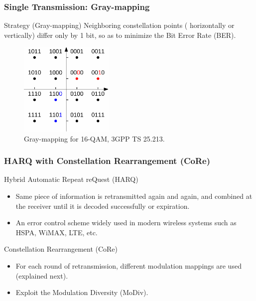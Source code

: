 \documentclass{beamer}
\begin{document}
\begin{frame}
  \frametitle{Single Transmission: Gray-mapping}
    \begin{block}{Strategy (Gray-mapping)}
      Neighboring constellation points ({\color{red} horizontally} or
      {\color{blue} vertically}) differ only by 1 bit, so as to
      minimize the Bit Error Rate (BER).
    \end{block}
    \begin{figure}
      \includegraphics[width=0.4\textwidth]{figs/16QAM_Gray.pdf}
      \caption{Gray-mapping for 16-QAM, 3GPP TS 25.213.}
    \end{figure}
\end{frame}

\begin{frame}
  \frametitle{HARQ with Constellation Rearrangement (CoRe)}
  \begin{block}{Hybrid Automatic Repeat reQuest (HARQ)}
    \begin{itemize}
      \item Same piece of information is retransmitted again and again, and
      combined at the receiver until it is decoded successfully or expiration.
      \item An error control scheme widely used in modern wireless systems such
      as HSPA, WiMAX, LTE, etc.
    \end{itemize}
  \end{block}
  \begin{block}{Constellation Rearrangement (CoRe)}
    \begin{itemize}
      \item For each round of retransmission, different modulation mappings are
      used (explained next).
      \item Exploit the Modulation Diversity (MoDiv).
    \end{itemize}
  \end{block}
\end{frame}
\end{document}
